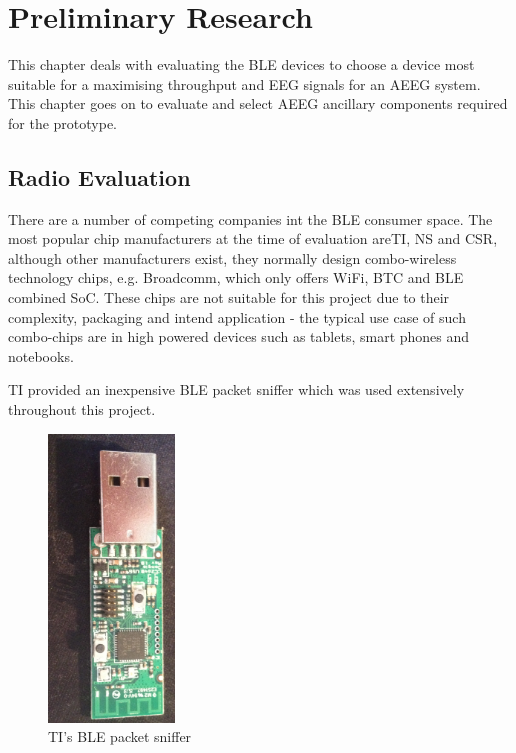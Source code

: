 \documentclass[]{article}
\begin{document}
{\clearpage

\section{Preliminary Research}

This chapter deals with evaluating the \ac{BLE} devices to choose a device most suitable for a maximising throughput and \ac{EEG} signals for an \ac{AEEG} system. This chapter goes on to evaluate and select \ac{AEEG} ancillary components required for the prototype.

\subsection{Radio Evaluation}

There are a number of competing companies int the \ac{BLE} consumer space. The most popular chip manufacturers at the time of evaluation are\ac{TI}, \ac{NS} and \ac{CSR}, although  other manufacturers exist, they normally design combo-wireless technology chips, e.g. Broadcomm, which only offers WiFi, \ac{BTC} and \ac{BLE} combined \ac{SoC}. These chips are not suitable for this project due to their complexity, packaging and intend application - the typical use case of such combo-chips are in high powered devices such as tablets, smart phones and notebooks. 

\ac{TI} provided an inexpensive \ac{BLE} packet sniffer which was used extensively throughout this project.

\begin{figure}[h]
	\begin{center}
		\includegraphics[width = 0.3\textwidth, angle = 90]{sniffer.png}
	\end{center}
	\caption{\ac{TI}'s \ac{BLE} packet sniffer }
	\label{fig:sniffer}
\end{figure}

}
\end{document}
